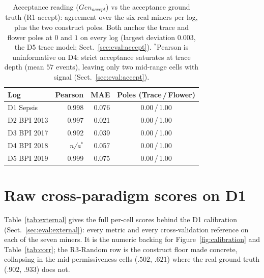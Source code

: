 \documentclass[runningheads]{llncs}
\newcommand{\chg}[1]{\textcolor{chgblue}{#1}}
\newcommand{\genaccept}{\ensuremath{\mathit{Gen}_{\mathit{accept}}}}
\begin{document}
\begin{table}[h]
\centering
\caption{Acceptance reading (\genaccept) vs the acceptance ground truth (R1-accept): agreement over the six real miners per log, plus the two construct poles. Both anchor the trace and flower poles at $0$ and $1$ on every log (largest deviation $0.003$, the D5 trace model; Sect.~\ref{sec:eval:accept}). $^{*}$Pearson is uninformative on D4: strict acceptance saturates at trace depth (mean $57$ events), leaving only two mid-range cells with signal (Sect.~\ref{sec:eval:accept}).}
\label{tab:accept-scale}
\setlength{\tabcolsep}{6pt}
\footnotesize
\begin{tabular}{@{}lrrc@{}}
\toprule
Log & Pearson & MAE & Poles (Trace\,/\,Flower) \\
\midrule
D1 Sepsis   & 0.998 & 0.076 & 0.00\,/\,1.00 \\
D2 BPI 2013 & 0.997 & 0.021 & 0.00\,/\,1.00 \\
D3 BPI 2017 & 0.992 & 0.039 & 0.00\,/\,1.00 \\
D4 BPI 2018 & \emph{n/a}$^{*}$ & 0.057 & 0.00\,/\,1.00 \\
D5 BPI 2019 & 0.999 & 0.075 & 0.00\,/\,1.00 \\
\bottomrule
\end{tabular}
\end{table}

\section{Raw cross-paradigm scores on D1}
\label{sec:appendix:external}
\chg{Table~\ref{tab:external} gives the full per-cell scores behind the D1 calibration (Sect.~\ref{sec:eval:external}): every metric and every cross-validation reference on each of the seven miners. It is the numeric backing for Figure~\ref{fig:calibration} and Table~\ref{tab:corr}; the R3-Random row is the construct floor made concrete, collapsing in the mid-permissiveness cells ($.502$, $.621$) where the real ground truth ($.902$, $.933$) does not.}
\end{document}
